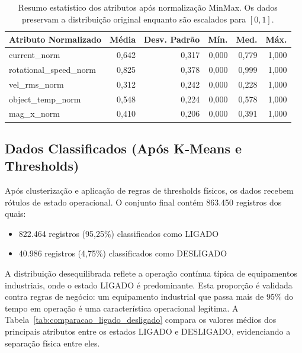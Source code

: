 \begin{table}[H]
  \centering
  \small
  \begin{tabular}{|l|r|r|r|r|r|}
    \hline
    \textbf{Atributo Normalizado} & \textbf{Média} & \textbf{Desv. Padrão} & \textbf{Mín.} & \textbf{Med.} & \textbf{Máx.} \\
    \hline
    current\_norm                 & 0,642          & 0,317                 & 0,000         & 0,779         & 1,000         \\
    rotational\_speed\_norm       & 0,825          & 0,378                 & 0,000         & 0,999         & 1,000         \\
    vel\_rms\_norm                & 0,312          & 0,242                 & 0,000         & 0,228         & 1,000         \\
    object\_temp\_norm            & 0,548          & 0,224                 & 0,000         & 0,578         & 1,000         \\
    mag\_x\_norm                  & 0,410          & 0,206                 & 0,000         & 0,391         & 1,000         \\
    \hline
  \end{tabular}
  \caption{Resumo estatístico dos atributos após normalização MinMax. Os dados preservam a distribuição original enquanto são escalados para $[0, 1]$.}
  \label{tab:dados_normalizados_stats}
\end{table}

\subsection{Dados Classificados (Após K-Means e Thresholds)}

Após clusterização e aplicação de regras de thresholds físicos, os dados recebem rótulos de estado operacional. O conjunto final contém 863.450 registros dos quais:

\begin{itemize}
  \item 822.464 registros (95,25\%) classificados como LIGADO
  \item 40.986 registros (4,75\%) classificados como DESLIGADO
\end{itemize}

A distribuição desequilibrada reflete a operação contínua típica de equipamentos industriais, onde o estado LIGADO é predominante. Esta proporção é validada contra regras de negócio: um equipamento industrial que passa mais de 95\% do tempo em operação é uma característica operacional legítima. A Tabela~\ref{tab:comparacao_ligado_desligado} compara os valores médios dos principais atributos entre os estados LIGADO e DESLIGADO, evidenciando a separação física entre eles.


